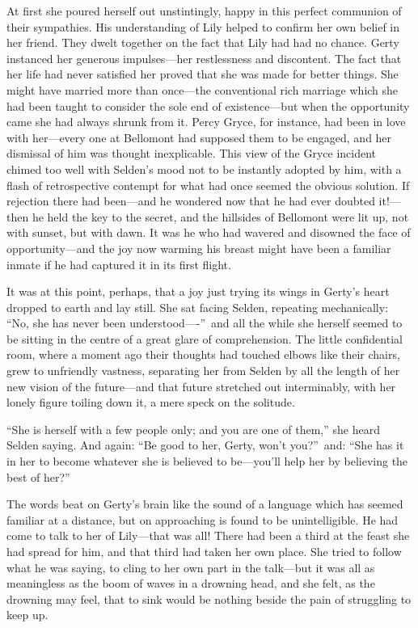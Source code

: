 \documentclass[12pt,a4paper]{book}
\begin{document}
At first she poured herself out unstintingly, happy in this
perfect communion of their sympathies. His understanding of Lily
helped to confirm her own belief in her friend. They dwelt
together on the fact that Lily had had no chance. Gerty instanced
her generous impulses---her restlessness and discontent. The fact
that her life had never satisfied her proved that she was made
for better things. She might have married more than once---the
conventional rich marriage which she had been taught to consider
the sole end of existence---but when the opportunity came she had
always shrunk from it. Percy Gryce, for instance, had been in
love with her---every one at Bellomont had supposed them to be
engaged, and her dismissal of him was thought inexplicable. This
view of the Gryce incident chimed too well with Selden's mood not
to be instantly adopted by him, with a flash of retrospective
contempt for what had once seemed the obvious solution. If
rejection there had been---and he wondered now that he had
ever doubted it!---then he held the key to the secret, and the
hillsides of Bellomont were lit up, not with sunset, but with
dawn. It was he who had wavered and disowned the face of
opportunity---and the joy now warming his breast might have been a
familiar inmate if he had captured it in its first flight.





It was at this point, perhaps, that a joy just trying its wings
in Gerty's heart dropped to earth and lay still. She sat facing
Selden, repeating mechanically: ``No, she has never been
understood----''\ and all the while she herself seemed to be sitting
in the centre of a great glare of comprehension. The little
confidential room, where a moment ago their thoughts had touched
elbows like their chairs, grew to unfriendly vastness, separating
her from Selden by all the length of her new vision of the
future---and that future stretched out interminably, with her
lonely figure toiling down it, a mere speck on the solitude.





``She is herself with a few people only; and you are one of them,''
she heard Selden saying. And again: ``Be good to her, Gerty, won't
you?''\ and: ``She has it in her to become whatever she is believed
to be---you'll help her by believing the best of her?''





The words beat on Gerty's brain like the sound of a language
which has seemed familiar at a distance, but on approaching is
found to be unintelligible. He had come to talk to her of
Lily---that was all! There had been a third at the feast she had
spread for him, and that third had taken her own place. She tried
to follow what he was saying, to cling to her own part in the
talk---but it was all as meaningless as the boom of waves in a
drowning head, and she felt, as the drowning may feel, that to
sink would be nothing beside the pain of struggling to keep up.
\end{document}
